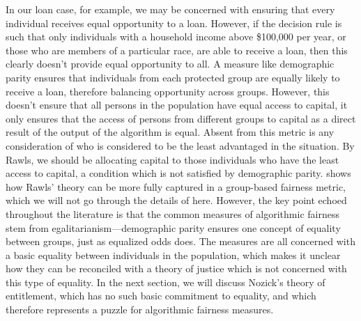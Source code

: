 In our loan case, for example, we may be concerned with ensuring that every
individual receives equal opportunity to a loan. However, if the decision rule
is such that only individuals with a household income above \$100,000 per year,
or those who are members of a particular race, are able to receive a loan, then
this clearly doesn't provide equal opportunity to all. A measure like
demographic parity ensures that individuals from each protected group are
equally likely to receive a loan, therefore balancing opportunity across groups.
However, this doesn't ensure that all persons in the population have equal
access to capital, it only ensures that the access of persons from different 
groups to capital as a direct result of the output of the algorithm is equal.
Absent from this metric is any consideration of who is considered to be the
least advantaged in the situation. By Rawls, we should be allocating capital to
those individuals who have the least access to capital, a condition which is not
satisfied by demographic parity. \citep{Hertweck_2023} shows how Rawls' theory
can be more fully captured in a group-based fairness metric, which we will not
go through the details of here. However, the key point echoed throughout the
literature is that the common measures of algorithmic fairness stem from 
egalitarianism—demographic parity ensures one concept of equality between
groups, just as equalized odds does. The measures are all concerned with a
basic equality between individuals in the population, which makes it unclear
how they can be reconciled with a theory of justice which is not concerned with
this type of equality. In the next section, we will discuss Nozick's theory of
entitlement, which has no such basic commitment to equality, and which
therefore represents a puzzle for algorithmic fairness measures.
